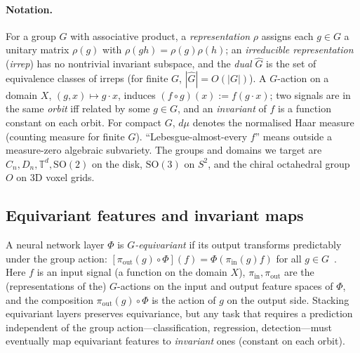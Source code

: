 \documentclass{article}
\theoremstyle{definition}
\theoremstyle{remark}
\newcommand{\SO}{\mathrm{SO}}
\theoremstyle{definition}
\begin{document}
\paragraph{Notation.}
For a group $G$ with associative product, a \emph{representation}
$\rho$ assigns each $g\in G$ a unitary matrix
$\rho(g)$ with $\rho(gh)=\rho(g)\rho(h)$; an \emph{irreducible
representation} (\emph{irrep}) has no nontrivial invariant subspace,
and the \emph{dual} $\hat{G}$ is the set of equivalence classes of
irreps (for finite $G$, $|\hat G|=O(|G|)$). A $G$-action on a domain
$X$, $(g,x)\mapsto g\cdot x$, induces
$(f\circ g)(x):= f(g\cdot x)$; two signals are in the same
\emph{orbit} iff related by some $g\in G$, and an \emph{invariant}
of $f$ is a function constant on each orbit. For compact $G$, $d\mu$
denotes the normalised Haar measure (counting measure for finite $G$).
``Lebesgue-almost-every $f$'' means outside a measure-zero algebraic
subvariety. The groups and domains we target are
$C_n,D_n,\mathbb{T}^d,\SO(2)$ on the disk, $\SO(3)$ on $S^2$, and the
chiral octahedral group $O$ on $3$D voxel grids.

\subsection{Equivariant features and invariant maps}

A neural network layer $\Phi$ is \emph{$G$-equivariant} if its output
transforms predictably under the group action:
$[\pi_{\mathrm{out}}(g) \circ \Phi](f) = \Phi(\pi_{\mathrm{in}}(g) f)$
for all $g \in G$~\citep{cohen2016group, weiler2019general}. Here $f$ is
an input signal (a function on the domain $X$),
$\pi_{\mathrm{in}}, \pi_{\mathrm{out}}$ are the (representations of the)
$G$-actions on the input and output feature spaces of $\Phi$, and the
composition $\pi_{\mathrm{out}}(g) \circ \Phi$ is the action of $g$ on
the output side. Stacking equivariant layers preserves equivariance, but
any task that requires a prediction independent of the group
action---classification, regression, detection---must eventually map
equivariant features to \emph{invariant} ones (constant on each orbit).
\end{document}
